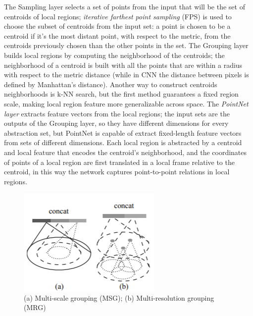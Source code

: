 The Sampling layer selects a set of points from the input that will be the set of centroids of local regions; \textit{iterative farthest point sampling} (FPS) is used to choose the subset of centroids from the input set: a point is chosen to be a centroid if it's the most distant point, with respect to the metric, from the centroids previously chosen than the other points in the set. The Grouping layer builds local regions by computing the neighborhood of the centroids; the neighborhood of a centroid is built with all the points that are within a radius with respect to the metric distance (while in CNN the distance between pixels is defined by Manhattan's distance). Another way to construct centroids neighborhoods is k-NN search, but the first method guarantees a fixed region scale, making local region feature more generalizable across space. The \textit{PointNet layer} extracts feature vectors from the local regions; the input sets are the outputs of the Grouping layer, so they have different dimensions for every abstraction set, but PointNet is capable of extract fixed-length feature vectors from sets of different dimensions. Each local region is abstracted by a centroid and local feature that encodes the centroid's neighborhood, and the coordinates of points of a local region are first translated in a local frame relative to the centroid, in this way the network captures point-to-point relations in local regions.

\begin{figure}
    \includegraphics[width=1\linewidth]{images/density_adaptive_pointnet.png} 
    \caption{(a) Multi-scale grouping (MSG); (b) Multi-resolution grouping (MRG)}
    \label{fig:density_adaptive_pointnet}
\end{figure}

